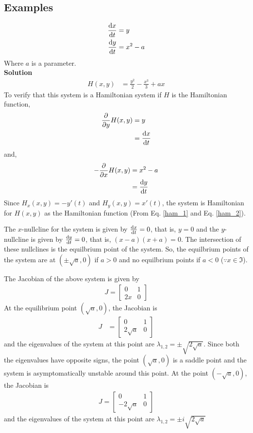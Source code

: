 \documentclass[12pt,1in]{article}
\newenvironment{Example}[2][Example]{\begin{trivlist}
		\item[\hskip \labelsep {\bfseries #1}\hskip \labelsep {\bfseries #2.}]}{\end{trivlist}}
\begin{document}
\subsection{Examples}
\begin{Example}{1}
	\begin{align*}
	\derivative{x}{t} &= y \\
	\derivative{y}{t} &= x^2 - a
	\end{align*}
	Where $a$ is a parameter. \\
	{\bfseries Solution\\}
	\begin{align*}
	H(x,y) &= \frac{y^2}{2} - \frac{x^3}{3} + ax
	\end{align*}
	To verify that this system is a Hamiltonian system if $H$ is the Hamiltonian function,
	\begin{align*}
	\frac{\partial}{\partial y}H(x,y) &= y\\
	&= \derivative{x}{t}
	\end{align*}
	and,
	\begin{align*}
	- \frac{\partial}{\partial x} H(x,y) &= x^2 - a\\
	&= \derivative{y}{t}
	\end{align*}
	Since $H_x(x,y) = - y'(t)$ and $H_y(x,y) = x'(t)$, the system is Hamiltonian for $H(x,y)$ as the Hamiltonian function (From Eq. \ref{ham_1} and Eq. \ref{ham_2}).
	
	
	The $x$-nullcline for the system is given by $\derivative{x}{t} = 0$, that is, $y = 0$ and the $y$-nullcline is given by $\derivative{y}{t}=0$, that is, $(x -a)(x+a) = 0$. The intersection of these nullclines is the equilbrium point of the system. So, the equilbrium points of the system are at $(\pm\sqrt{a}, 0)$ if $a > 0$ and no equilbrium points if $a < 0$ ($\because x \in \Im$).
	
	The Jacobian of the above system is given by 
	\begin{align*}
	J = \begin{bmatrix}
	0 & 1 \\
	2x & 0
	\end{bmatrix}
	\end{align*} 
	At the equilibrium point $(\sqrt{a}, 0)$, the Jacobian is 
	\begin{align*}
	J &= \begin{bmatrix}
	0 & 1 \\
	2\sqrt{a} & 0
	\end{bmatrix}
	\end{align*}
	and the eigenvalues of the system at this point are $\lambda_{1,2} = \pm \sqrt{2 \sqrt{a}}$. Since both the eigenvalues have opposite signs, the point $(\sqrt{a}, 0)$ is a saddle point and the system is asymptomatically unstable around this point. At the point $(-\sqrt{a}, 0)$, the Jacobian is 
	\begin{align*}
	J = \begin{bmatrix}
	0 & 1 \\
	-2\sqrt{a} & 0
	\end{bmatrix}
	\end{align*} 
	and the eigenvalues of the system at this point are $\lambda_{1,2} = \pm i \sqrt{2 \sqrt{a}}$
	

\end{Example}
\end{document}
